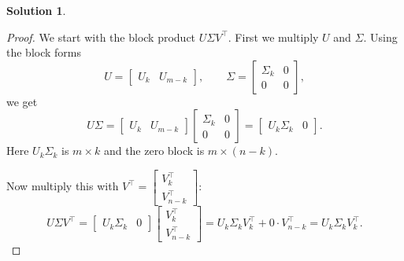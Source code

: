 \documentclass{amsart}[11pt]
\theoremstyle{definition}
\newtheorem*{solution}{Solution}
\begin{document}
\begin{solution}
\begin{enumerate}[(a)]
\begin{proof}
            We start with the block product $U\Sigma V^\top$. First we multiply $U$ and $\Sigma$. Using the block forms
            \[
            U=\begin{bmatrix}U_k & U_{m-k}\end{bmatrix},\qquad \Sigma=\begin{bmatrix}\Sigma_k & 0\\0 & 0\end{bmatrix},
            \]
            we get
            \[
            U\Sigma = \begin{bmatrix}U_k & U_{m-k}\end{bmatrix}
            \begin{bmatrix}\Sigma_k & 0\\0 & 0\end{bmatrix}
            = \begin{bmatrix}U_k\Sigma_k & 0\end{bmatrix}.
            \]
            Here $U_k\Sigma_k$ is $m\times k$ and the zero block is $m\times (n-k)$.

            Now multiply this with $V^\top=\begin{bmatrix}V_k^\top\\V_{n-k}^\top\end{bmatrix}$:
            \[
            U\Sigma V^\top
            = \begin{bmatrix}U_k\Sigma_k & 0\end{bmatrix}
            \begin{bmatrix}V_k^\top\\V_{n-k}^\top\end{bmatrix}
            = U_k\Sigma_k V_k^\top + 0\cdot V_{n-k}^\top
            = U_k\Sigma_k V_k^\top.
            \]

        \end{proof}
    \end{enumerate}
\end{solution}
\end{document}

